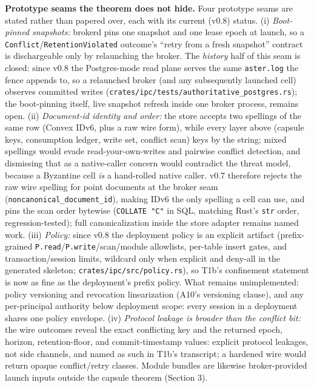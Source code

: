 \documentclass[
  11pt,
]{article}
\begin{document}
\textbf{Prototype seams the theorem does not hide.} Four prototype seams are stated rather than papered over, each with its current (v0.8) status. (i) \emph{Boot-pinned snapshots:} brokerd pins one snapshot and one lease epoch at launch, so a \texttt{Conflict}/\texttt{RetentionViolated} outcome's ``retry from a fresh snapshot'' contract is dischargeable only by relaunching the broker. The \emph{history} half of this seam is closed: since v0.8 the Postgres-mode read plane serves the same \texttt{aster.log} the fence appends to, so a relaunched broker (and any subsequently launched cell) observes committed writes (\texttt{crates/ipc/tests/authoritative\_postgres.rs}); the boot-pinning itself, live snapshot refresh inside one broker process, remains open. (ii) \emph{Document-id identity and order:} the store accepts two spellings of the same row (Convex IDv6, plus a raw wire form), while every layer above (capsule keys, consumption ledger, write set, conflict scan) keys by the string; mixed spellings would evade read-your-own-writes and pairwise conflict detection, and dismissing that as a native-caller concern would contradict the threat model, because a Byzantine cell \emph{is} a hand-rolled native caller. v0.7 therefore rejects the raw wire spelling for point documents at the broker seam (\texttt{noncanonical\_document\_id}), making IDv6 the only spelling a cell can use, and pins the scan order bytewise (\texttt{COLLATE\ "C"} in SQL, matching Rust's \texttt{str} order, regression-tested); full canonicalization inside the store adapter remains named work. (iii) \emph{Policy:} since v0.8 the deployment policy is an explicit artifact (prefix-grained \texttt{P.read}/\texttt{P.write}/scan/module allowlists, per-table insert gates, and transaction/session limits, wildcard only when explicit and deny-all in the generated skeleton; \texttt{crates/ipc/src/policy.rs}), so T1b's confinement statement is now as fine as the deployment's prefix policy. What remains unimplemented: policy versioning and revocation linearization (A10's versioning clause), and any per-principal authority below deployment scope: every session in a deployment shares one policy envelope. (iv) \emph{Protocol leakage is broader than the conflict bit:} the wire outcomes reveal the exact conflicting key and the returned epoch, horizon, retention-floor, and commit-timestamp values: explicit protocol leakages, not side channels, and named as such in T1b's transcript; a hardened wire would return opaque conflict/retry classes. Module bundles are likewise broker-provided launch inputs outside the capsule theorem (Section 3).
\end{document}
